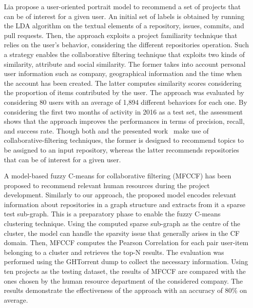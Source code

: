 Lia \etal \cite{liao_user_2018} propose a user-oriented portrait model to 
recommend a set of \GH projects that can be of interest for a given user. An 
initial set of labels is obtained by running the LDA algorithm on the textual 
elements of a repository, \ie issues, commits, and pull requests. Then, the 
approach exploits a project familiarity technique that relies on the user's 
behavior, considering the different repositories operation. Such a strategy 
enables the collaborative filtering technique that exploits two kinds of 
similarity, \ie attribute and social similarity. The former takes into account personal user information such as company, geographical information 
and the time when the account has been created. The latter computes similarity scores considering the proportion of items contributed by the user. 
The approach was evaluated by considering 80 users with an average of 
1,894 different behaviors for each one. By considering the first two months of 
activity in 2016 as a test set, the assessment shows that the approach improves 
the performances in terms of precision, recall, and success rate. %
Though both \TF and the presented work~\cite{liao_user_2018} make use of collaborative-filtering techniques, the 
former is designed to recommend topics to be assigned to an input \GH 
repository, whereas the latter recommends \GH repositories that can be of 
interest for a given user.


A model-based fuzzy C-means for collaborative filtering (MFCCF) has been 
proposed \cite{ajoudanian_recommending_2019} to recommend relevant human 
resources during the \GH project development. Similarly to our approach, the 
proposed model encodes relevant information about repositories in a graph 
structure and extracts from it a sparse test sub-graph. This is a 
preparatory phase to enable the fuzzy C-means clustering technique. Using the 
computed sparse sub-graph as the centre of the cluster, the model can handle 
the sparsity issue that generally arises in the CF domain. Then, MFCCF computes 
the Pearson Correlation for each pair user-item belonging to a cluster and 
retrieves the top-N results. The evaluation was performed using the GHTorrent 
dump to collect the necessary information. Using ten projects as the testing 
dataset, the results of MFCCF are compared with the ones chosen by the human 
resource department of the considered company. The results demonstrate the 
effectiveness of the approach with an accuracy of 80\% on average. 

